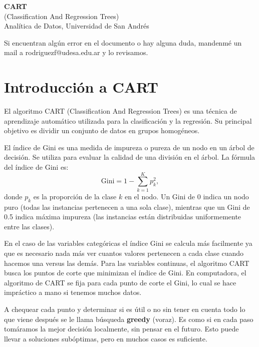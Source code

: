 \documentclass[12pt]{article}
\begin{document}
\begin{center}
  {\LARGE \textbf{CART}}\\[0.5em]
  {\normalsize (Classification And Regression Trees)}\\[0.5em]
  {Analítica de Datos, Universidad de San Andrés}
\end{center}

Si encuentran algún error en el documento o hay alguna duda, mandenmé un mail a rodriguezf@udesa.edu.ar y lo revisamos.

\section{Introducción a CART}
El algoritmo CART (Classification And Regression Trees) es una técnica de aprendizaje automático utilizada para la clasificación y la regresión. Su principal objetivo es dividir un conjunto de datos en grupos homogéneos.

\vspace{1em}

El índice de Gini es una medida de impureza o pureza de un nodo en un árbol de decisión. Se utiliza para evaluar la calidad de una división en el árbol. La fórmula del índice de Gini es:
\[
  \mathrm{Gini} = 1 - \sum_{k=1}^K p_k^2,
\]
donde \(p_k\) es la proporción de la clase \(k\) en el nodo. Un Gini de 0 indica un nodo puro (todas las instancias pertenecen a una sola clase), mientras que un Gini de 0.5 indica máxima impureza (las instancias están distribuidas uniformemente entre las clases).

\vspace{1em}

En el caso de las variables categóricas el índice Gini se calcula más facilmente ya que es necesario nada más ver cuantos valores pertenecen a cada clase cuando hacemos una versus las demás. Para las variables continuas, el algoritmo CART busca los puntos de corte que minimizan el índice de Gini. En computadora, el algoritmo de CART se fija para cada punto de corte el Gini, lo cual se hace impráctico a mano si tenemos muchos datos.

\vspace{1em}

A chequear cada punto y determinar si es útil o no sin tener en cuenta todo lo que viene después se le llama búsqueda \textbf{greedy} (voraz). Es como si en cada paso tomáramos la mejor decisión localmente, sin pensar en el futuro. Esto puede llevar a soluciones subóptimas, pero en muchos casos es suficiente.
\end{document}
